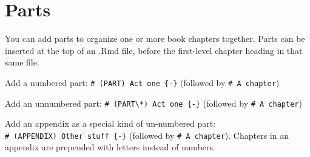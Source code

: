 \documentclass[
]{book}
\theoremstyle{definition}
\theoremstyle{definition}
\theoremstyle{definition}
\theoremstyle{definition}
\theoremstyle{remark}
\begin{document}
\hypertarget{parts}{%
\chapter{Parts}\label{parts}}

You can add parts to organize one or more book chapters together. Parts can be inserted at the top of an .Rmd file, before the first-level chapter heading in that same file.

Add a numbered part: \texttt{\#\ (PART)\ Act\ one\ \{-\}} (followed by \texttt{\#\ A\ chapter})

Add an unnumbered part: \texttt{\#\ (PART\textbackslash{}*)\ Act\ one\ \{-\}} (followed by \texttt{\#\ A\ chapter})

Add an appendix as a special kind of un-numbered part: \texttt{\#\ (APPENDIX)\ Other\ stuff\ \{-\}} (followed by \texttt{\#\ A\ chapter}). Chapters in an appendix are prepended with letters instead of numbers.

  
\end{document}

